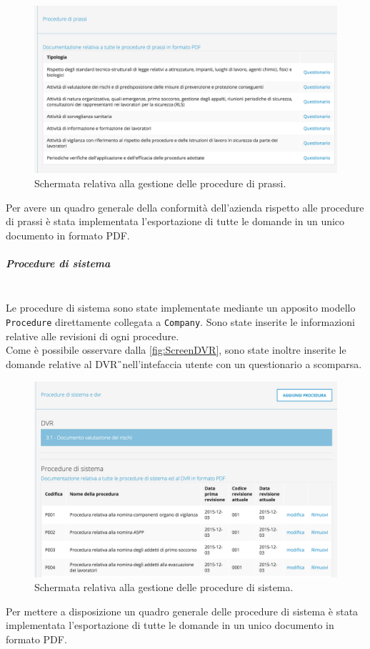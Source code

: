 		\begin{figure}[H]
			\begin{center}
				\includegraphics[width=14cm]{Pics/ScreenProcedureDiPrassi.png}
				\caption{Schermata relativa alla gestione delle procedure di prassi.}
				\label{fig:ScreenProcedureDiPrassi}
			\end{center}
		\end{figure}
		Per avere un quadro generale della conformità dell'azienda rispetto alle procedure di prassi è stata implementata l'esportazione di tutte le domande in un unico documento in formato PDF.
		
		\subparagraph*{Procedure di sistema}\mbox{}\\
			
			Le procedure di sistema sono state implementate mediante un apposito modello \texttt{Procedure} direttamente collegata a \texttt{Company}. Sono state inserite le informazioni relative alle revisioni di ogni procedure.\\
			Come è possibile osservare dalla \autoref{fig:ScreenDVR}, sono state inoltre inserite le domande relative al \gls{DVR}\G\ nell'intefaccia utente con un questionario a scomparsa.
			
			
			\begin{figure}[H]
				\begin{center}
					\includegraphics[width=14cm]{Pics/ScreenDVR.png}
					\caption{Schermata relativa alla gestione delle procedure di sistema.}
					\label{fig:ScreenDVR}
				\end{center}
			\end{figure}
			Per mettere a disposizione un quadro generale delle procedure di sistema è stata implementata l'esportazione di tutte le domande in un unico documento in formato PDF.
			
